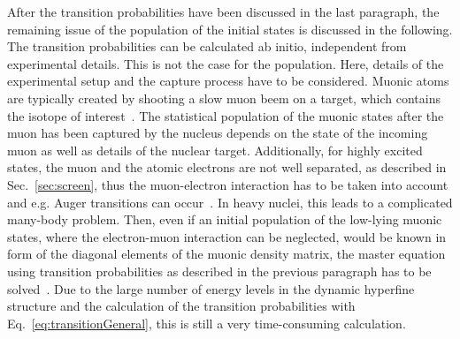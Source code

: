 After the transition probabilities have been discussed in the last paragraph, the remaining issue of the population of the initial states is discussed in the following.
The transition probabilities can be calculated ab initio, independent from experimental details. This is not the case for the population. Here, details of the experimental setup and the capture process have to be considered. Muonic atoms are typically created by shooting a slow muon beem on a target, which contains the isotope of interest~\cite{wu1969,Devons1995,BorieRinker1982}. The statistical population of the muonic states after the muon has been captured by the nucleus depends on the state of the incoming muon as well as details of the nuclear target. Additionally, for highly excited states, the muon and the atomic electrons are not well separated, as described in Sec.~\ref{sec:screen}, thus the muon-electron interaction has to be taken into account and e.g. Auger transitions can occur~\cite{pisano1982}. In heavy nuclei, this leads to a complicated many-body problem. Then, even if an initial population of the low-lying muonic states, where the electron-muon interaction can be neglected, would be known in form of the diagonal elements of the muonic density matrix, the master equation using transition probabilities as described in the previous paragraph has to be solved~\cite{pisano1982}. Due to the large number of energy levels in the dynamic hyperfine structure and the calculation of the transition probabilities with Eq.~\eqref{eq:transitionGeneral}, this is still a very time-consuming calculation.


